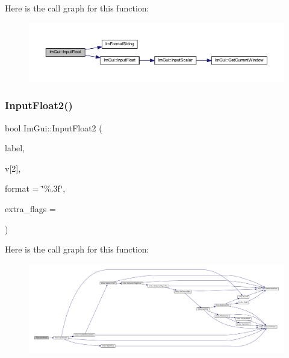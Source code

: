 Here is the call graph for this function\+:
\nopagebreak
\begin{figure}[H]
\begin{center}
\leavevmode
\includegraphics[width=350pt]{namespace_im_gui_a15edd4acce19b15d9309d3cab51445be_cgraph}
\end{center}
\end{figure}
\mbox{\label{namespace_im_gui_ad7b5c47b0ff982749dfdbe2e3d32b397}} 
\subsubsection{\texorpdfstring{Input\+Float2()}{InputFloat2()}\hspace{0.1cm}{\footnotesize\ttfamily [1/2]}}
{\footnotesize\ttfamily bool Im\+Gui\+::\+Input\+Float2 (\begin{DoxyParamCaption}\item[{const char $\ast$}]{label,  }\item[{float}]{v\mbox{[}2\mbox{]},  }\item[{const char $\ast$}]{format = {\ttfamily \char`\"{}\%.3f\char`\"{}},  }\item[{\mbox{\hyperlink{imgui_8h_a7d2c6153a6b9b5d3178ce82434ac9fb8}{Im\+Gui\+Input\+Text\+Flags}}}]{extra\+\_\+flags = {} }\end{DoxyParamCaption})}

Here is the call graph for this function\+:
\nopagebreak
\begin{figure}[H]
\begin{center}
\leavevmode
\includegraphics[width=350pt]{namespace_im_gui_ad7b5c47b0ff982749dfdbe2e3d32b397_cgraph}
\end{center}
\end{figure}
\mbox{\label{namespace_im_gui_a320460d1aa6c93f09ef77d6532a013db}} 
